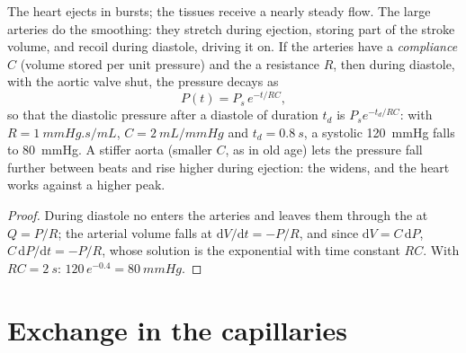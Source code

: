 \begin{theorem}\label{thm:b2:blood-circulation:windkessel}
The heart ejects in bursts; the tissues receive a nearly steady
flow. The large arteries do the smoothing: they stretch during
ejection, storing part of the stroke volume, and recoil during
diastole, driving it on. If the arteries have a \emph{compliance}
$C$ (volume stored per unit pressure) and the  a
resistance $R$, then during diastole, with the aortic valve shut,
the pressure decays as
\[
P(t) = P_{s}\,e^{-t/RC},
\]
so that the diastolic pressure after a diastole of duration $t_d$
is $P_s e^{-t_d/RC}$: with $R = \qty{1}{mmHg.s/mL}$, $C =
\qty{2}{mL/mmHg}$ and $t_d = \qty{0.8}{s}$, a systolic
\qty{120}{mmHg} falls to \qty{80}{mmHg}. A stiffer aorta (smaller
$C$, as in old age) lets the pressure fall further between beats
and rise higher during ejection: the \emph{} widens,
and the heart works against a higher peak.
\end{theorem}
\begin{proof}
During diastole no  enters the arteries and  leaves them
through the  at $Q = P/R$; the arterial volume falls at
$\mathrm{d}V/\mathrm{d}t = -P/R$, and since $\mathrm{d}V = C\,
\mathrm{d}P$, $C\,\mathrm{d}P/\mathrm{d}t = -P/R$, whose solution is
the exponential with time constant $RC$. With $RC = \qty{2}{s}$:
$120\,e^{-0.4} = \qty{80}{mmHg}$.
\end{proof}

\section{Exchange in the capillaries}

